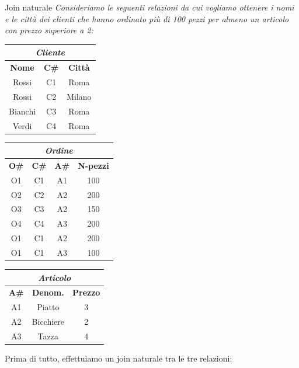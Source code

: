 \begin{Example}{Join naturale}{}
    \textit{Consideriamo le seguenti relazioni da cui vogliamo ottenere i nomi e le città dei clienti che hanno ordinato più di 100 pezzi per almeno un articolo con prezzo superiore a 2:}
    \begin{center}
        \begin{tabular}{|c|c|c|}
            \hline\multicolumn{3}{|c|}{\textit{Cliente}}\\\hline
            \textbf{Nome} & \textbf{C\#} & \textbf{Città}\\\hline
            Rossi & C1 & Roma\\
            Rossi & C2 & Milano\\
            Bianchi & C3 & Roma\\
            Verdi & C4 & Roma\\\hline
        \end{tabular}
        \begin{tabular}{|c|c|c|c|}
            \hline\multicolumn{4}{|c|}{\textit{Ordine}}\\\hline
            \textbf{O\#} & \textbf{C\#} & \textbf{A\#} & \textbf{N-pezzi}\\\hline
            O1 & C1 & A1 & 100\\
            O2 & C2 & A2 & 200\\
            O3 & C3 & A2 & 150\\
            O4 & C4 & A3 & 200\\
            O1 & C1 & A2 & 200\\
            O1 & C1 & A3 & 100\\\hline
        \end{tabular}
        \begin{tabular}{|c|c|c|}
            \hline\multicolumn{3}{|c|}{\textit{Articolo}}\\\hline
            \textbf{A\#} & \textbf{Denom.} & \textbf{Prezzo}\\\hline
            A1 & Piatto & 3\\
            A2 & Bicchiere & 2\\
            A3 & Tazza & 4\\\hline
        \end{tabular}
        \bigskip
    \end{center}
    Prima di tutto, effettuiamo un join naturale tra le tre relazioni:
    \begin{equation*}

\end{equation*}
\end{Example}
